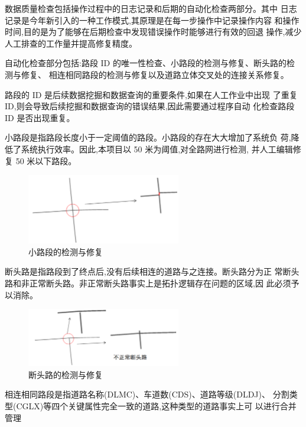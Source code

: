 数据质量检查包括操作过程中的日志记录和后期的自动化检查两部分。其中
日志记录是今年新引入的一种工作模式,其原理是在每一步操作中记录操作内容
和操作时间,目的是为了能够在后期检查中发现错误操作时能够进行有效的回退
操作,减少人工排查的工作量并提高修复精度。

自动化检查部分包括:路段 ID 的唯一性检查、小路段的检测与修复、断头路的检测与修复、
相连相同路段的检测与修复以及道路立体交叉处的连接关系修复。

路段的 ID 是后续数据挖掘和数据查询的重要条件,如果在人工作业中出现
了重复 ID,则会导致后续挖掘和数据查询的错误结果,因此需要通过程序自动
化检查路段 ID 是否出现重复。

小路段是指路段长度小于一定阈值的路段。小路段的存在大大增加了系统负
荷,降低了系统执行效率。因此,本项目以 50 米为阈值,对全路网进行检测,
并人工编辑修复 50 米以下路段。

\begin{figure}[ht]
  \centering
  \includegraphics[width=0.6\textwidth]{figures/chp02_小路段的检测与修复.png}
  \caption{小路段的检测与修复\label{fig:小路段的检测与修复}}
\end{figure}

断头路是指路段到了终点后,没有后续相连的道路与之连接。断头路分为正
常断头路和非正常断头路。非正常断头路事实上是拓扑逻辑存在问题的区域,因
此必须予以消除。

\begin{figure}[ht]
  \centering
  \includegraphics[width=0.6\textwidth]{figures/chp02_断头路的检测与修复.png}
  \caption{断头路的检测与修复\label{fig:断头路的检测与修复}}
\end{figure}

相连相同路段是指道路名称(DLMC)、车道数(CDS)、道路等级(DLDJ)、
分割类型(CGLX)等四个关键属性完全一致的道路,这种类型的道路事实上可
以进行合并管理

